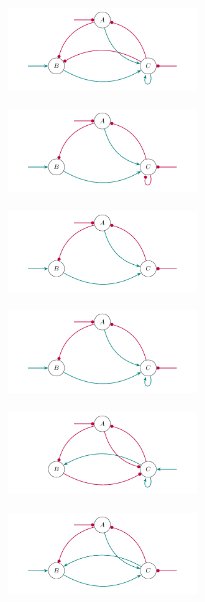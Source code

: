\documentclass[varwidth=18cm, border=10pt]{standalone}
\begin{document}
\begin{figure}
\begin{subfigure}{6cm}
\centering\includegraphics[width=5cm]{oommpmomppppm.pdf}
\caption{}
\end{subfigure}
\begin{subfigure}{6cm}
\centering\includegraphics[width=5cm]{oommpmoopppmm.pdf}
\caption{}
\end{subfigure}
\begin{subfigure}{6cm}
\centering\includegraphics[width=5cm]{oommpmoopppom.pdf}
\caption{}
\end{subfigure}
\begin{subfigure}{6cm}
\centering\includegraphics[width=5cm]{oommpmooppppm.pdf}
\caption{}
\end{subfigure}
\begin{subfigure}{6cm}
\centering\includegraphics[width=5cm]{oommpmopommpp.pdf}
\caption{}
\end{subfigure}
\begin{subfigure}{6cm}
\centering\includegraphics[width=5cm]{oommpmoppppom.pdf}

\end{subfigure}
\end{figure}
\end{document}
